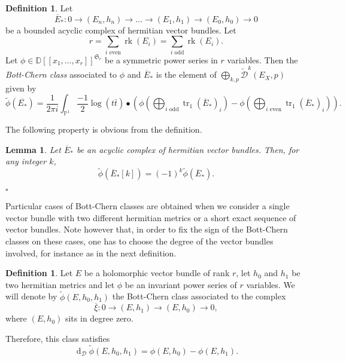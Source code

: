 \documentclass[10pt,twoside]{article}
\numberwithin{equation}{section}
\theoremstyle{plain}
\newtheorem{lemma}[equation]{Lemma}
\theoremstyle{definition}
\newtheorem{definition}[equation]{Definition}
\DeclareMathOperator{\tr}{tr}
\DeclareMathOperator{\dd}{d}
\DeclareMathOperator{\rk}{rk}
\begin{document}
\begin{definition}
  \label{def:1}
  Let 
  \begin{displaymath}
    \overline{E}_{\ast}\colon 0\longrightarrow(E_{n},h_{n})\longrightarrow
    \dots \longrightarrow (E_{1},h_{1}) 
    \longrightarrow(E_{0},h_{0})\longrightarrow 0
  \end{displaymath}
  be a bounded acyclic complex of hermitian vector bundles. Let
  \begin{displaymath}
    r=\sum_{i\text{ even}} \rk(E_{i})=\sum_{i\text{ odd}} \rk(E_{i}). 
  \end{displaymath}
  Let $\phi\in \mathbb{D}[[x_{1},\dots ,x_{r}]]^{\mathfrak{S}_{r}}$ be
  a symmetric power series in $r$ variables. Then the 
  \emph{Bott-Chern class} associated to $\phi $ and
  $\overline{E}_{\ast}$ is the element of
  $\bigoplus_{k,p}\widetilde{\mathcal{D}}^{k}(E_{X},p)$ given by
  \begin{displaymath}
    \widetilde{\phi}(\overline{E_{\ast}})=
    \frac{1}
    {2\pi
      i}\int_{\mathbb{P}^{1}}\frac{-1}{2}\log(t\bar{t}) \bullet 
    (\phi(\bigoplus_{i\text{ odd}}\tr_{1}(\overline{E}_{\ast})_{i})- 
    \phi
    (\bigoplus_{i\text{ even}}\tr_{1}(\overline{E}_{\ast})_{i})
    ).
  \end{displaymath}
\end{definition}

The following property is obvious from the definition.
\begin{lemma}
  Let $\overline E_{\ast}$ be an acyclic complex of hermitian
  vector bundles. Then, for any integer $k$,
  \begin{displaymath}
    \widetilde{\phi}(\overline{E}_{\ast
    }[k])=(-1)^{k}\widetilde{\phi}(\overline{E}_{\ast }). 
  \end{displaymath}
\end{lemma}
\hfill$\square$


Particular cases of Bott-Chern classes are obtained when we consider a
single vector bundle with two different hermitian metrics or a short
exact sequence of vector bundles. Note however that, in order to fix
the sign of the Bott-Chern classes on these cases, one has to
choose the degree of the vector bundles involved, for instance as in
the next definition.  
\begin{definition} \label{def:11} 
Let $E$ be
a holomorphic vector bundle of rank $r$, let $h_{0}$ and  $h_{1}$
be two hermitian metrics and let $\phi $ be an invariant power series of
$r$ variables. We will denote by $\widetilde \phi (E,h_{0},h_{1})$ the
Bott-Chern class associated to the complex
\begin{displaymath}
  \overline {\xi}\colon 0\longrightarrow (E,h_{1})\longrightarrow
  (E,h_{0})\longrightarrow 0, 
\end{displaymath}
where $(E,h_{0})$ sits in degree zero. 
\end{definition}
Therefore, this class satisfies
\begin{displaymath}
  \dd_{\mathcal{D}}\widetilde \phi (E,h_{0},h_{1})=\phi (E,h_{0})-\phi
  (E,h_{1}). 
\end{displaymath}
\end{document}

